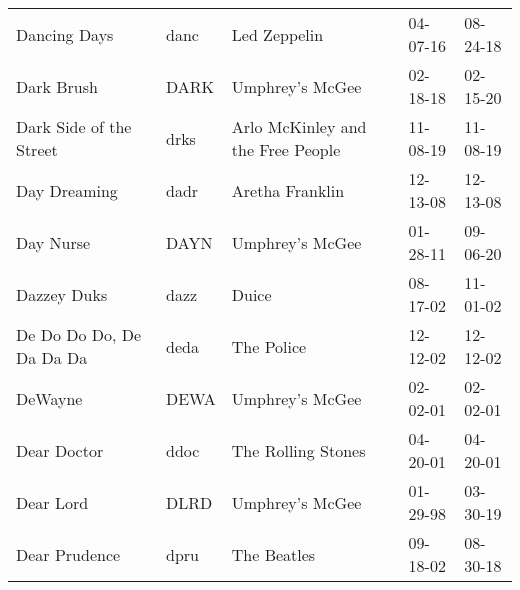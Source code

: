 \begin{longtable}{p{}p{}p{}p{}p{}}
                                                            Dancing Days &          danc &                                             Led Zeppelin &              04-07-16 &             08-24-18 \\
                                                              Dark Brush &          DARK &                                          Umphrey's McGee &              02-18-18 &             02-15-20 \\
                                                 Dark Side of the Street &          drks &                        Arlo McKinley and the Free People &              11-08-19 &             11-08-19 \\
                                                            Day Dreaming &          dadr &                                          Aretha Franklin &              12-13-08 &             12-13-08 \\
                                                               Day Nurse &          DAYN &                                          Umphrey's McGee &              01-28-11 &             09-06-20 \\
                                                             Dazzey Duks &          dazz &                                                    Duice &              08-17-02 &             11-01-02 \\
                                                De Do Do Do, De Da Da Da &          deda &                                               The Police &              12-12-02 &             12-12-02 \\
                                                                 DeWayne &          DEWA &                                          Umphrey's McGee &              02-02-01 &             02-02-01 \\
                                                             Dear Doctor &          ddoc &                                       The Rolling Stones &              04-20-01 &             04-20-01 \\
                                                               Dear Lord &          DLRD &                                          Umphrey's McGee &              01-29-98 &             03-30-19 \\
                                                           Dear Prudence &          dpru &                                              The Beatles &              09-18-02 &             08-30-18 \\

\end{longtable}
